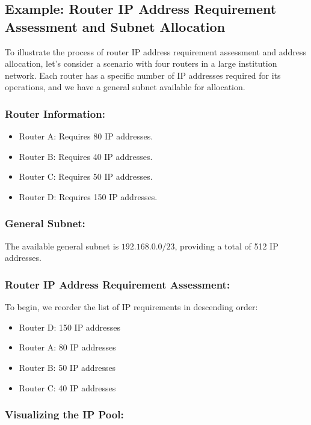 \subsection{Example: Router IP Address Requirement Assessment and Subnet Allocation}

To illustrate the process of router IP address requirement assessment and address allocation, let's consider a scenario with four routers in a large institution network. Each router has a specific number of IP addresses required for its operations, and we have a general subnet available for allocation.

\subsubsection{Router Information:}
\begin{itemize}
  \item Router A: Requires 80 IP addresses.
  \item Router B: Requires 40 IP addresses.
  \item Router C: Requires 50 IP addresses.
  \item Router D: Requires 150 IP addresses.
\end{itemize}

\subsubsection{General Subnet:}

The available general subnet is $192.168.0.0/23$, providing a total of 512 IP addresses.

\subsubsection{Router IP Address Requirement Assessment:}

To begin, we reorder the list of IP requirements in descending order:
\begin{itemize}
  \item Router D: 150 IP addresses
  \item Router A: 80 IP addresses
  \item Router B: 50 IP addresses
  \item Router C: 40 IP addresses
\end{itemize}


\subsubsection{Visualizing the IP Pool:}

